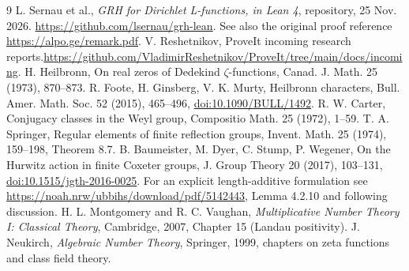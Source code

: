 \documentclass[11pt]{article}
\theoremstyle{remark}\newtheorem{remark}[theorem]{Remark}
\begin{document}
\begin{thebibliography}{9}
 L. Sernau et al., \emph{GRH for Dirichlet L-functions, in Lean 4}, repository, 25 Nov. 2026. \url{https://github.com/lsernau/grh-lean}. See also the original proof reference \url{https://alpo.ge/remark.pdf}.
 V. Reshetnikov, ProveIt incoming research reports.\newline \url{https://github.com/VladimirReshetnikov/ProveIt/tree/main/docs/incoming}.
 H. Heilbronn, On real zeros of Dedekind $\zeta$-functions, Canad. J. Math. 25 (1973), 870--873.
 R. Foote, H. Ginsberg, V. K. Murty, Heilbronn characters, Bull. Amer. Math. Soc. 52 (2015), 465--496, \href{https://doi.org/10.1090/BULL/1492}{doi:10.1090/BULL/1492}.
 R. W. Carter, Conjugacy classes in the Weyl group, Compositio Math. 25 (1972), 1--59.
 T. A. Springer, Regular elements of finite reflection groups, Invent. Math. 25 (1974), 159--198, Theorem 8.7.
 B. Baumeister, M. Dyer, C. Stump, P. Wegener, On the Hurwitz action in finite Coxeter groups, J. Group Theory 20 (2017), 103--131, \href{https://doi.org/10.1515/jgth-2016-0025}{doi:10.1515/jgth-2016-0025}. For an explicit length-additive formulation see \url{https://noah.nrw/ubbihs/download/pdf/5142443}, Lemma 4.2.10 and following discussion.
 H. L. Montgomery and R. C. Vaughan, \emph{Multiplicative Number Theory I: Classical Theory}, Cambridge, 2007, Chapter 15 (Landau positivity).
 J. Neukirch, \emph{Algebraic Number Theory}, Springer, 1999, chapters on zeta functions and class field theory.
\end{thebibliography}
\end{document}
